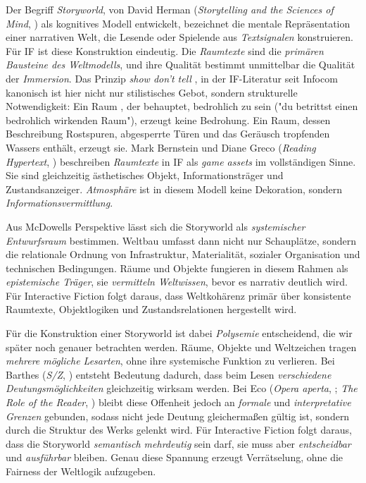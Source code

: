 \documentclass[parskip=half,a4paper,11pt]{scrreprt}
\begin{document}
Der Begriff \textit{Storyworld}, von David Herman (\textit{Storytelling and the Sciences of Mind}, \citep{Herman2011}) als kognitives Modell entwickelt, bezeichnet die mentale Repräsentation einer narrativen Welt, die Lesende oder Spielende aus \textit{Textsignalen} konstruieren. Für IF ist diese Konstruktion eindeutig. Die \textit{Raumtexte} sind die \textit{primären Bausteine des Weltmodells}, und ihre Qualität bestimmt unmittelbar die Qualität der \textit{Immersion}. Das Prinzip \textit{show don't tell} , in der IF-Literatur seit Infocom kanonisch ist hier nicht nur stilistisches Gebot, sondern strukturelle Notwendigkeit: Ein Raum , der behauptet, bedrohlich zu sein ("du betrittst einen bedrohlich wirkenden Raum"), erzeugt keine Bedrohung. Ein Raum, dessen Beschreibung Rostspuren, abgesperrte Türen und das Geräusch tropfenden Wassers enthält, erzeugt sie. Mark Bernstein und Diane Greco (\textit{Reading Hypertext}, \citep{Bernstein2009}) beschreiben \textit{Raumtexte} in IF als \textit{game assets} im vollständigen Sinne. Sie sind gleichzeitig ästhetisches Objekt, Informationsträger und Zustandsanzeiger. \textit{Atmosphäre }ist in diesem Modell keine Dekoration, sondern \textit{Informationsvermittlung}.

Aus McDowells Perspektive lässt sich die Storyworld als \textit{systemischer Entwurfsraum} bestimmen. Weltbau umfasst dann nicht nur Schauplätze, sondern die relationale Ordnung von Infrastruktur, Materialität, sozialer Organisation und technischen Bedingungen. Räume und Objekte fungieren in diesem Rahmen als \textit{epistemische Träger}, sie \textit{vermitteln Weltwissen}, bevor es narrativ deutlich wird. Für Interactive Fiction folgt daraus, dass Weltkohärenz primär über konsistente Raumtexte, Objektlogiken und Zustandsrelationen hergestellt wird.

Für die Konstruktion einer Storyworld ist dabei \textit{Polysemie} entscheidend, die wir später noch genauer betrachten werden. Räume, Objekte und Weltzeichen tragen \textit{mehrere mögliche Lesarten}, ohne ihre systemische Funktion zu verlieren. Bei Barthes (\textit{S/Z}, \citep{Barthes1970}) entsteht Bedeutung dadurch, dass beim Lesen \textit{verschiedene Deutungsmöglichkeiten} gleichzeitig wirksam werden. Bei Eco (\textit{Opera aperta}, \citep{Eco1962}; \textit{The Role of the Reader}, \citep{Eco1979b}) bleibt diese Offenheit jedoch an \textit{formale} und \textit{interpretative Grenzen} gebunden, sodass nicht jede Deutung gleichermaßen gültig ist, sondern durch die Struktur des Werks gelenkt wird. Für Interactive Fiction folgt daraus, dass die Storyworld \textit{semantisch mehrdeutig} sein darf,  sie muss aber \textit{entscheidbar} und \textit{ausführbar} bleiben. Genau diese Spannung erzeugt Verrätselung, ohne die Fairness der Weltlogik aufzugeben.
\end{document}
